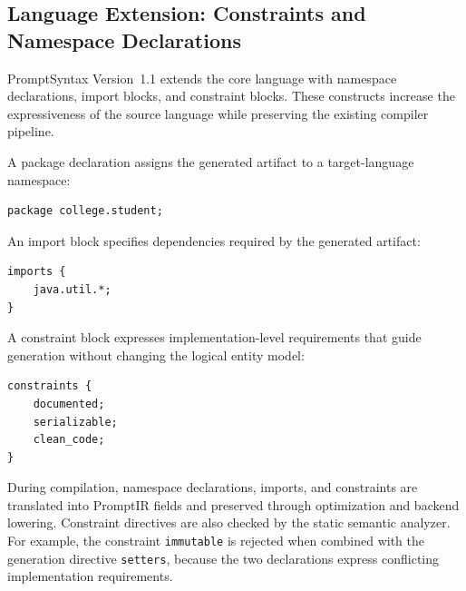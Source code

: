 \subsection{Language Extension: Constraints and Namespace Declarations}
\label{subsec:v11-extension}

PromptSyntax Version~1.1 extends the core language with namespace declarations, import blocks, and constraint blocks. These constructs increase the expressiveness of the source language while preserving the existing compiler pipeline.

A package declaration assigns the generated artifact to a target-language namespace:

\begin{lstlisting}
package college.student;
\end{lstlisting}

An import block specifies dependencies required by the generated artifact:

\begin{lstlisting}
imports {
    java.util.*;
}
\end{lstlisting}

A constraint block expresses implementation-level requirements that guide generation without changing the logical entity model:

\begin{lstlisting}
constraints {
    documented;
    serializable;
    clean_code;
}
\end{lstlisting}

During compilation, namespace declarations, imports, and constraints are translated into PromptIR fields and preserved through optimization and backend lowering. Constraint directives are also checked by the static semantic analyzer. For example, the constraint \texttt{immutable} is rejected when combined with the generation directive \texttt{setters}, because the two declarations express conflicting implementation requirements.

